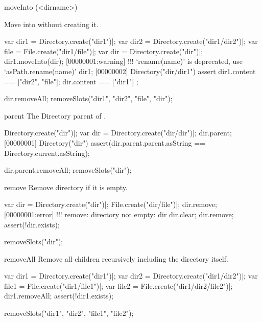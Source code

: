 \begin{urbiscriptapi}
\item[moveInto](<dirname>)
  \experimental{}

  Move \this into  without creating it.
\begin{urbiscript}[firstnumber=1]
var dir1 = Directory.create("dir1")|;
var dir2 = Directory.create("dir1/dir2")|;
var file = File.create("dir1/file")|;
var dir = Directory.create("dir")|;
dir1.moveInto(dir);
[00000001:warning] !!! `rename(name)' is deprecated, use `asPath.rename(name)'
dir1;
[00000002] Directory("dir/dir1")
assert
{
  dir1.content == ["dir2", "file"];
  dir.content == ["dir1"]
};
\end{urbiscript}
\begin{urbicomment}
dir.removeAll;
removeSlots("dir1", "dir2", "file", "dir");
\end{urbicomment}


\item[parent]
  The Directory parent of \this.
\begin{urbiscript}
Directory.create("dir")|;
var dir = Directory.create("dir/dir")|;
dir.parent;
[00000001] Directory("dir")
assert(dir.parent.parent.asString == Directory.current.asString);
\end{urbiscript}
\begin{urbicomment}
dir.parent.removeAll;
removeSlots("dir");
\end{urbicomment}


\item[remove]
  Remove \this directory if it is empty.
\begin{urbiscript}
var dir = Directory.create("dir")|;
File.create("dir/file")|;
dir.remove;
[00000001:error] !!! remove: directory not empty: dir
dir.clear;
dir.remove;
assert(!dir.exists);
\end{urbiscript}
\begin{urbicomment}
removeSlots("dir");
\end{urbicomment}


\item[removeAll]
  Remove all children recursively including the directory itself.
\begin{urbiscript}
var dir1 = Directory.create("dir1")|;
var dir2 = Directory.create("dir1/dir2")|;
var file1 = File.create("dir1/file1")|;
var file2 = File.create("dir1/dir2/file2")|;
dir1.removeAll;
assert(!dir1.exists);
\end{urbiscript}
\begin{urbicomment}
removeSlots("dir1", "dir2", "file1", "file2");
\end{urbicomment}



\end{urbiscriptapi}

